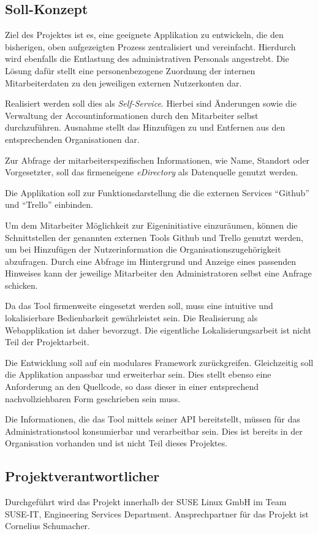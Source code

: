 \subsection{Soll-Konzept}
\label{sec:Soll-Konzept}
Ziel des Projektes ist es, eine geeignete Applikation zu entwickeln, die den bisherigen, oben
aufgezeigten Prozess zentralisiert und vereinfacht. Hierdurch wird ebenfalls die Entlastung des
administrativen Personals angestrebt. Die Lösung dafür stellt eine personenbezogene Zuordnung der
internen Mitarbeiterdaten zu den jeweiligen externen Nutzerkonten dar.

Realisiert werden soll dies als \textit{Self-Service}. Hierbei sind Änderungen sowie die Verwaltung
der Accountinformationen durch den Mitarbeiter selbst durchzuführen. Ausnahme stellt das Hinzufügen
zu und Entfernen aus den entsprechenden Organisationen dar.

Zur Abfrage der mitarbeiterspezifischen Informationen, wie Name, Standort oder Vorgesetzter, soll
das firmeneigene \textit{eDirectory} als Datenquelle genutzt werden.

Die Applikation soll zur Funktionsdarstellung die die externen Services “Github” und “Trello” einbinden.

Um dem Mitarbeiter Möglichkeit zur Eigeninitiative einzuräumen, können die Schnittstellen der
genannten externen Tools Github und Trello genutzt werden, um bei Hinzufügen der Nutzerinformation
die Organisationszugehörigkeit abzufragen. Durch eine Abfrage im Hintergrund und Anzeige eines
passenden Hinweises kann der jeweilige Mitarbeiter den Administratoren selbst eine Anfrage schicken.

Da das Tool firmenweite eingesetzt werden soll, muss eine intuitive und lokalisierbare
Bedienbarkeit gewährleistet sein. Die Realisierung als Webapplikation ist daher bevorzugt.
Die eigentliche Lokalisierungsarbeit ist nicht Teil der Projektarbeit.

Die Entwicklung soll auf ein modulares Framework zurückgreifen. Gleichzeitig soll die Applikation
anpassbar und erweiterbar sein. Dies stellt ebenso eine Anforderung an den Quellcode, so dass dieser
in einer entsprechend nachvollziehbaren Form geschrieben sein muss.

Die Informationen, die das Tool mittels seiner API bereitstellt, müssen für das Administrationstool
 konsumierbar und verarbeitbar sein. Dies ist bereits in der Organisation vorhanden und
ist nicht Teil dieses Projektes.

\subsection{Projektverantwortlicher}
\label{sec:Projektverantwortlicher}
Durchgeführt wird das Projekt innerhalb der SUSE Linux GmbH im Team SUSE-IT, Engineering Services
Department. Ansprechpartner für das Projekt ist Cornelius Schumacher.


